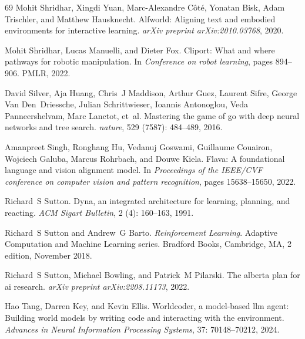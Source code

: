 \begin{thebibliography}{69}
Mohit Shridhar, Xingdi Yuan, Marc-Alexandre C{\^o}t{\'e}, Yonatan Bisk, Adam Trischler, and Matthew Hausknecht.
\newblock Alfworld: Aligning text and embodied environments for interactive learning.
\newblock \emph{arXiv preprint arXiv:2010.03768}, 2020.

Mohit Shridhar, Lucas Manuelli, and Dieter Fox.
\newblock Cliport: What and where pathways for robotic manipulation.
\newblock In \emph{Conference on robot learning}, pages 894--906. PMLR, 2022.

David Silver, Aja Huang, Chris~J Maddison, Arthur Guez, Laurent Sifre, George Van Den~Driessche, Julian Schrittwieser, Ioannis Antonoglou, Veda Panneershelvam, Marc Lanctot, et~al.
\newblock Mastering the game of go with deep neural networks and tree search.
\newblock \emph{nature}, 529 (7587): 484--489, 2016.

Amanpreet Singh, Ronghang Hu, Vedanuj Goswami, Guillaume Couairon, Wojciech Galuba, Marcus Rohrbach, and Douwe Kiela.
\newblock Flava: A foundational language and vision alignment model.
\newblock In \emph{Proceedings of the IEEE/CVF conference on computer vision and pattern recognition}, pages 15638--15650, 2022.

Richard~S Sutton.
\newblock Dyna, an integrated architecture for learning, planning, and reacting.
\newblock \emph{ACM Sigart Bulletin}, 2 (4): 160--163, 1991.

Richard~S Sutton and Andrew~G Barto.
\newblock \emph{Reinforcement Learning}.
\newblock Adaptive Computation and Machine Learning series. Bradford Books, Cambridge, MA, 2 edition, November 2018.

Richard~S Sutton, Michael Bowling, and Patrick~M Pilarski.
\newblock The alberta plan for ai research.
\newblock \emph{arXiv preprint arXiv:2208.11173}, 2022.

Hao Tang, Darren Key, and Kevin Ellis.
\newblock Worldcoder, a model-based llm agent: Building world models by writing code and interacting with the environment.
\newblock \emph{Advances in Neural Information Processing Systems}, 37: 70148--70212, 2024.


\end{thebibliography}
